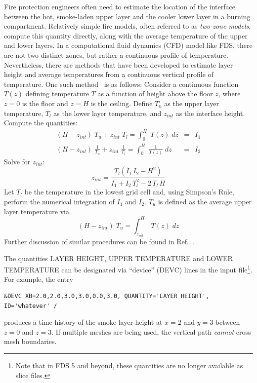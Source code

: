 \documentclass[11pt]{book}
\newcommand{\be}{\begin{equation}}
\newcommand{\ee}{\end{equation}}
\begin{document}
Fire protection engineers often need to estimate the location of the interface between
the hot, smoke-laden upper layer and the cooler lower layer in a burning compartment.
Relatively simple fire models, often referred to as {\em two-zone models}, compute
this quantity directly, along with the average temperature of the upper and lower layers.
In a computational fluid dynamics (CFD) model like FDS, there are not two distinct zones,
but rather a continuous profile of temperature. Nevertheless, there are methods that
have been developed to estimate layer height and average temperatures from a continuous
vertical profile of temperature. One such method~\cite{Janssens:JFS1992} is as follows:
Consider a continuous function $T(z)$ defining temperature $T$ as a function of height above
the floor $z$, where $z=0$ is the floor and $z=H$ is the ceiling. Define $T_u$ as the
upper layer temperature, $T_l$ as the lower layer temperature, and $z_{int}$ as the
interface height. Compute the quantities:
\begin{eqnarray*} (H-z_{int})\; T_u + z_{int} \; T_l = \int_0^H \; T(z) \; dz &=& I_1 \\
                  (H-z_{int})\; \frac{1}{T_u} + z_{int} \; \frac{1}{T_l} = \int_0^H \; \frac{1}{T(z)} \; dz &=& I_2 \end{eqnarray*}
Solve for $z_{int}$:
\be z_{int} = \frac{ T_l(I_1 \, I_2 - H^2)}{I_1+I_2 \, T_l^2 - 2\, T_l \, H} \ee
Let $T_l$ be the temperature in the lowest grid cell and, using Simpson's Rule, perform the
numerical integration of $I_1$ and $I_2$. $T_u$ is defined as the average upper layer
temperature via
\be (H-z_{int})\; T_u = \int_{z_{int}}^H \; T(z) \; dz \ee
Further discussion of similar procedures can be found in Ref.~\cite{He:1}.

The quantities {\ct LAYER HEIGHT}, {\ct UPPER TEMPERATURE} and {\ct LOWER TEMPERATURE}
can be designated via ``device'' ({\ct DEVC}) lines in the input file\footnote{Note that in FDS 5 and beyond, these quantities
are no longer available as slice files.}. For example, the entry

\footnotesize
\begin{verbatim}
&DEVC XB=2.0,2.0,3.0,3.0,0.0,3.0, QUANTITY='LAYER HEIGHT', ID='whatever' /
\end{verbatim}
\normalsize

\noindent
produces a time history of the smoke layer height at $x=2$ and $y=3$ between $z=0$ and $z=3$.
If multiple meshes are being used, the vertical path {\em cannot} cross mesh boundaries.
\end{document}
